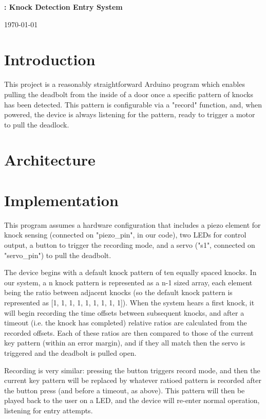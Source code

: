 \documentclass[11pt]{article}			%
\author{Matt Nichols}
\date{\today}
\begin{document}
\centerline{\bf \LARGE\thishw: Knock Detection Entry System}
\centerline{\today}

\section{Introduction}

This project is a reasonably straightforward Arduino program which enables pulling the deadbolt from the inside of a door once a specific pattern of knocks has been detected. This pattern is configurable via a "record" function, and, when powered, the device is always listening for the pattern, ready to trigger a motor to pull the deadlock.

\section{Architecture}

\section{Implementation}

This program assumes a hardware configuration that includes a piezo element for knock sensing (connected on "piezo\_pin", in our code), two LEDs for control output, a button to trigger the recording mode, and a servo ("s1", connected on "servo\_pin") to pull the deadbolt.

The device begins with a default knock pattern of ten equally spaced knocks. In our system, a n knock pattern is represented as a n-1 sized array, each element being the ratio between adjacent knocks (so the default knock pattern is represented as [1, 1, 1, 1, 1, 1, 1, 1, 1]). When the system hears a first knock, it will begin recording the time offsets between subsequent knocks, and after a timeout (i.e. the knock has completed) relative ratios are calculated from the recorded offsets. Each of these ratios are then compared to those of the current key pattern (within an error margin), and if they all match then the servo is triggered and the deadbolt is pulled open.

Recording is very similar: pressing the button triggers record mode, and then the current key pattern will be replaced by whatever ratioed pattern is recorded after the button press (and before a timeout, as above). This pattern will then be played back to the user on a LED, and the device will re-enter normal operation, listening for entry attempts.
\end{document}
